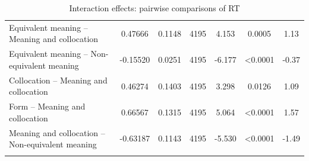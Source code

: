 \documentclass[output=paper,colorlinks,citecolor=brown,nonflat]{langsci/langscibook}
\begin{document}
\begin{table}
\begin{tabular}{>{\raggedright}p{3.85cm} S[table-format=-1.4] S[table-format=1.4] S[table-format=3.0] S[table-format=-1.4] S[table-format=<1.4] S[table-format=-1.2] }
        Equivalent meaning -- Meaning and collocation & 0.47666 & 0.1148 & 4195 & 4.153 & 0.0005 & 1.13\\
        Equivalent meaning -- Non-equivalent meaning & -0.15520 & 0.0251 & 4195 & -6.177 & <0.0001 & -0.37\\
        Collocation -- Meaning and collocation & 0.46274 & 0.1403 & 4195 & 3.298 & 0.0126 & 1.09\\
        Form -- Meaning and collocation & 0.66567 & 0.1315 & 4195 & 5.064 & <0.0001 & 1.57\\
        Meaning and collocation -- Non-equivalent meaning & -0.63187 & 0.1143 & 4195 & -5.530 & <0.0001 & -1.49\\
    \lspbottomrule
    \end{tabular}
    \caption{Interaction effects: pairwise comparisons of RT\label{tab:gudmundson:5}}
\end{table}
\end{document}

